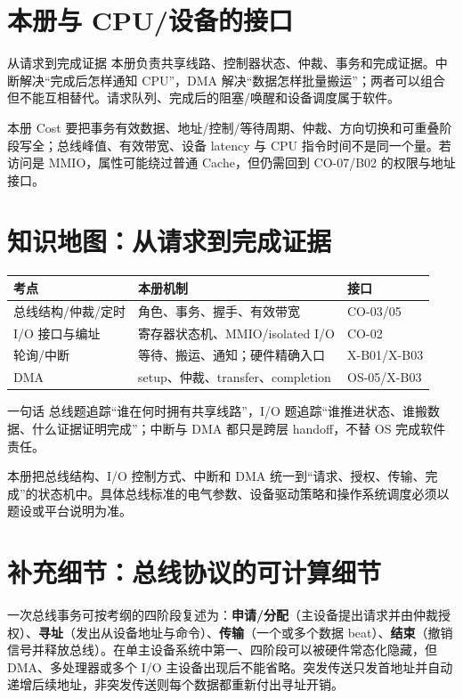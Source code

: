\documentclass[UTF8,fontset=fandol,11pt,a4paper]{ctexart}
\newcommand{\kw}[1]{\textbf{\color{deep}#1}}
\begin{document}
\section{本册与 CPU/设备的接口}
\begin{corebox}{从请求到完成证据}
本册负责共享线路、控制器状态、仲裁、事务和完成证据。中断解决“完成后怎样通知 CPU”，DMA 解决“数据怎样批量搬运”；两者可以组合但不能互相替代。请求队列、完成后的阻塞/唤醒和设备调度属于软件。
\end{corebox}
本册 Cost 要把事务有效数据、地址/控制/等待周期、仲裁、方向切换和可重叠阶段写全；总线峰值、有效带宽、设备 latency 与 CPU 指令时间不是同一个量。若访问是 MMIO，属性可能绕过普通 Cache，但仍需回到 CO-07/B02 的权限与地址接口。

\section{知识地图：从请求到完成证据}
\begin{center}\small
\begin{tabularx}{\linewidth}{L{3.0cm}YY}\toprule
考点 & 本册机制 & 接口\\\midrule
总线结构/仲裁/定时 & 角色、事务、握手、有效带宽 & CO-03/05\\
I/O 接口与编址 & 寄存器状态机、MMIO/isolated I/O & CO-02\\
轮询/中断 & 等待、搬运、通知；硬件精确入口 & X-B01/X-B03\\
DMA & setup、仲裁、transfer、completion & OS-05/X-B03\\
\bottomrule
\end{tabularx}
\end{center}

\begin{corebox}{一句话}
总线题追踪“谁在何时拥有共享线路”，I/O 题追踪“谁推进状态、谁搬数据、什么证据证明完成”；中断与 DMA 都只是跨层 handoff，不替 OS 完成软件责任。
\end{corebox}

本册把总线结构、I/O 控制方式、中断和 DMA 统一到“请求、授权、传输、完成”的状态机中。具体总线标准的电气参数、设备驱动策略和操作系统调度必须以题设或平台说明为准。

\section{补充细节：总线协议的可计算细节}
一次总线事务可按考纲的四阶段复述为：\kw{申请/分配}（主设备提出请求并由仲裁授权）、\kw{寻址}（发出从设备地址与命令）、\kw{传输}（一个或多个数据 beat）、\kw{结束}（撤销信号并释放总线）。在单主设备系统中第一、四阶段可以被硬件常态化隐藏，但 DMA、多处理器或多个 I/O 主设备出现后不能省略。突发传送只发首地址并自动递增后续地址，非突发传送则每个数据都重新付出寻址开销。
\end{document}
